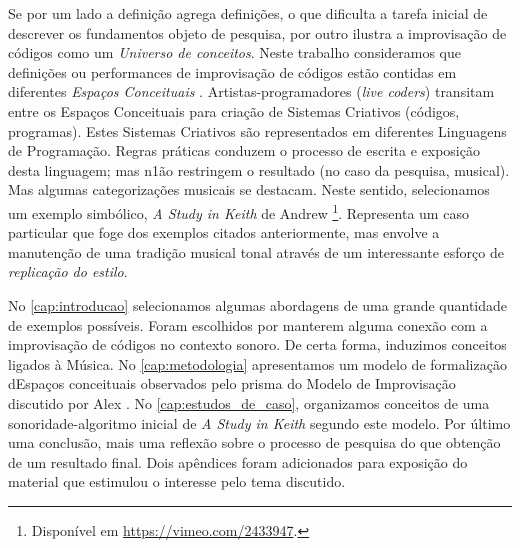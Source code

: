 Se por um lado a definição agrega definições, o que dificulta a tarefa inicial de descrever os fundamentos objeto de pesquisa, por outro ilustra a improvisação de códigos como um \emph{Universo de conceitos}. Neste trabalho consideramos que definições ou performances de improvisação de códigos estão contidas em diferentes \emph{Espaços Conceituais} \cite{wiggins_framework_2006,mclean_music_2006}. Artistas-programadores (\emph{live coders}) transitam entre os Espaços Conceituais para criação de Sistemas Criativos (códigos, programas). Estes Sistemas Criativos são representados em diferentes Linguagens de Programação. Regras práticas conduzem o processo de escrita e exposição desta linguagem; mas n1ão restringem o resultado (no caso da pesquisa, musical). Mas algumas categorizações musicais se destacam.  Neste sentido, selecionamos um exemplo simbólico, \emph{A Study in Keith} de Andrew \footnote{Disponível em \url{https://vimeo.com/2433947}.}. Representa um caso particular que foge dos exemplos citados anteriormente, mas envolve a manutenção de uma tradição musical tonal através de um interessante esforço de \emph{replicação do estilo}. 

No \autoref{cap:introducao} selecionamos algumas abordagens de uma grande quantidade de exemplos possíveis. Foram escolhidos por manterem alguma conexão com a improvisação de códigos no contexto sonoro. De certa forma, induzimos conceitos ligados à Música.  No \autoref{cap:metodologia} apresentamos um modelo de formalização dEspaços conceituais observados pelo prisma do Modelo de Improvisação discutido por Alex . No \autoref{cap:estudos_de_caso}, organizamos conceitos de uma sonoridade-algoritmo inicial de \emph{A Study in Keith} segundo este modelo. Por último uma conclusão, mais uma reflexão sobre o processo de pesquisa do que obtenção de um resultado final. Dois apêndices foram adicionados para exposição do material que estimulou o interesse pelo tema discutido.